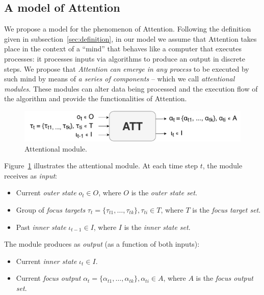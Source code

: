 \documentclass[12pt]{article}
\begin{document}
\subsection{A model of Attention}
We propose a model for the phenomenon of Attention.
Following the definition given in subsection~\ref{sec:definition}, in our model we assume that Attention takes place in the context
of a ``mind'' that behaves like a computer that executes processes: it processes inputs via algorithms to produce an output in discrete steps.
We propose that \emph{Attention can emerge in any process} to be executed by such mind by means of \emph{a series of components} -- which we call \emph{attentional modules}. These modules can alter data being processed and the execution flow of the algorithm and provide the functionalities of Attention.

\begin{figure}[H]
    \centering
    \includegraphics[width=1.0\linewidth]{./img/alt_att_block.pdf}
    \caption{Attentional module.}
    \label{fig:attmodule}
\end{figure}

Figure~\ref{fig:attmodule} illustrates the attentional module. At each time step $t$, the module receives as \emph{input}:
\begin{itemize}
    \item Current \emph{outer state} $o_t \in O$, where $O$ is the \emph{outer state set}.
    \item Group of \emph{focus targets} $\tau_t = \{\tau_{t1}, \ldots, \tau_{tk}\}, \tau_{ti} \in T$, where $T$ is the \emph{focus target set}.
    \item Past \emph{inner state} $\iota_{t-1} \in I$, where $I$ is the \emph{inner state set}.
\end{itemize}

The module produces as \emph{output} (as a function of both inputs):
\begin{itemize}
    \item Current \emph{inner state} $\iota_t \in I$.
    \item Current \emph{focus output} $\alpha_t = \{\alpha_{t1}, \ldots, \alpha_{tk}\}, \alpha_{ti} \in A$,
        where $A$ is the \emph{focus output set}.
\end{itemize}
\end{document}
